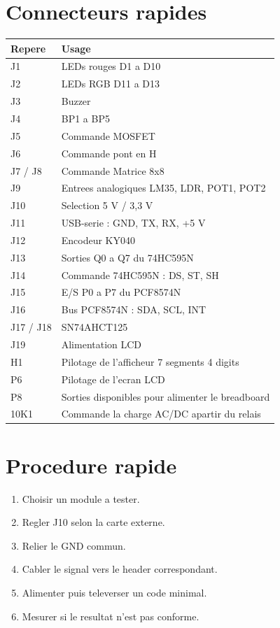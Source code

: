 \documentclass[10pt,a4paper]{article}
\begin{document}
\begin{multicols}{2}

\section*{Connecteurs rapides}

{\small
\begin{tabularx}{\linewidth}{@{}L{1.8cm}Y@{}}
\toprule
{}
\textbf{Repere} & \textbf{Usage} \\
\midrule
J1 & LEDs rouges D1 a D10 \\
J2 & LEDs RGB D11 a D13 \\
J3 & Buzzer \\
J4 & BP1 a BP5 \\
J5 & Commande MOSFET \\
J6 & Commande pont en H \\
J7 / J8 & Commande Matrice 8x8 \\
J9 & Entrees analogiques LM35, LDR, POT1, POT2 \\
J10 & Selection 5 V / 3,3 V \\
J11 & USB-serie : GND, TX, RX, +5 V \\
J12 & Encodeur KY040 \\
J13 & Sorties Q0 a Q7 du 74HC595N \\
J14 & Commande 74HC595N : DS, ST, SH \\
J15 & E/S P0 a P7 du PCF8574N \\
J16 & Bus PCF8574N : SDA, SCL, INT \\
J17 / J18 & SN74AHCT125 \\
J19 & Alimentation LCD \\
H1 & Pilotage de l'afficheur 7 segments 4 digits \\
P6 & Pilotage de l'ecran LCD \\
P8 & Sorties disponibles pour alimenter le breadboard \\
10K1 &  Commande la charge AC/DC apartir du relais \\

\bottomrule
\end{tabularx}
}

\section*{Procedure rapide}

\begin{enumerate}
\item Choisir un module a tester.
\item Regler J10 selon la carte externe.
\item Relier le GND commun.
\item Cabler le signal vers le header correspondant.
\item Alimenter puis televerser un code minimal.
\item Mesurer si le resultat n'est pas conforme.
\end{enumerate}


\end{multicols}
\end{document}
